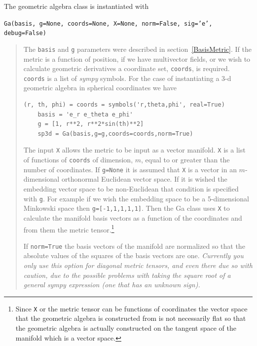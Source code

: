 \documentclass[12pt]{report}
\newcommand{\T}[1]{\texttt{#1}}
\begin{document}
The geometric algebra class is instantiated with

\T{Ga(basis, g=None, coords=None, X=None, norm=False, sig='e', debug=False)}
\begin{quote}
   The \T{basis} and \T{g} parameters were described in section~\ref{BasisMetric}.
   If the metric is a function of position, if we have multivector fields, or we
   wish to calculate geometric derivatives a coordinate set, \T{coords}, is required.
   \T{coords} is a list of \emph{sympy} symbols.  For the case of instantiating a 3-d geometric
   algebra in spherical coordinates we have
   \begin{lstlisting}[numbers=none]
    (r, th, phi) = coords = symbols('r,theta,phi', real=True)
    basis = 'e_r e_theta e_phi'
    g = [1, r**2, r**2*sin(th)**2]
    sp3d = Ga(basis,g=g,coords=coords,norm=True)
   \end{lstlisting}
   The input \T{X} allows the metric to be input as a vector manifold.
   \T{X} is a list of functions of \T{coords} of dimension, $m$, equal to or greater
   than the number of coordinates.  If \T{g=None} it is assumed that \T{X} is a
   vector in an $m$-dimensional orthonormal Euclidean vector space. If it is wished
   the embedding vector space to be non-Euclidean that condition is specified with
   \T{g}.  For example if we wish the embedding space to be a 5-dimensional Minkowski
   space then \T{g=[-1,1,1,1,1]}.  Then the Ga class uses \T{X} to calculate the
   manifold basis vectors as a function of the coordinates and from them the metric
   tensor.\footnote{Since \T{X} or the metric tensor can be functions of coordinates
   the vector space that the geometric algebra is constructed from is not necessarily
   flat so that the geometric algebra is actually constructed on the tangent space of
   the manifold which is a vector space.}

   If \T{norm=True} the basis vectors of the manifold are normalized so that the
   absolute values of the squares of the basis vectors are one. \emph{Currently you
   only use this option for diagonal metric tensors, and even there due so
   with caution, due to the possible
   problems with taking the square root of a general \emph{sympy} expression (one that has an
   unknown sign).}


\end{quote}
\end{document}
